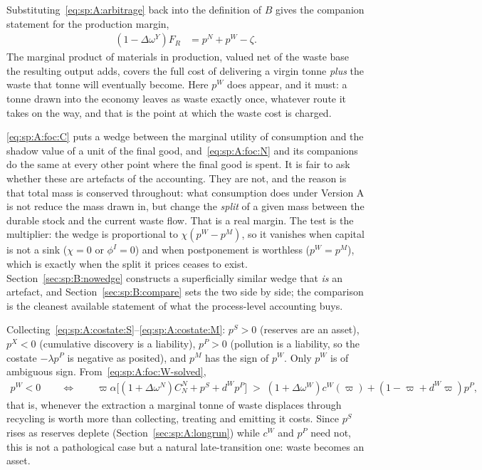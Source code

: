 Substituting~\eqref{eq:sp:A:arbitrage} back into the definition of $B$ gives the companion
statement for the production margin,
\begin{align}
\left(1-\Delta\omega^Y\right)F_R &= p^N+p^W-\zeta .
\label{eq:sp:A:FR}
\end{align}
The marginal product of materials in production, valued net of the waste base the resulting output
adds, covers the full cost of delivering a virgin tonne \emph{plus} the waste that tonne will
eventually become. Here $p^W$ does appear, and it must: a tonne drawn into the economy leaves as waste
exactly once, whatever route it takes on the way, and that is the point at which the waste cost is
charged.

 \eqref{eq:sp:A:foc:C} puts a wedge between the marginal utility of
consumption and the shadow value of a unit of the final good, and~\eqref{eq:sp:A:foc:N} and its
companions do the same at every other point where the final good is spent. It is fair to ask whether
these are artefacts of the accounting. They are not, and the reason is that total mass is conserved
throughout: what consumption does under Version A is not reduce the mass drawn in, but change the
\emph{split} of a given mass between the durable stock and the current waste flow. That is a real
margin. The test is the multiplier: the wedge is proportional to $\chi\left(p^W-p^M\right)$, so it
vanishes when capital is not a sink ($\chi=0$ or $\phi^I=0$) and when postponement is worthless
($p^W=p^M$), which is exactly when the split it prices ceases to exist.
Section~\ref{sec:sp:B:nowedge} constructs a superficially similar wedge that \emph{is} an artefact, and
Section~\ref{sec:sp:B:compare} sets the two side by side; the comparison is the cleanest available
statement of what the process-level accounting buys.

 Collecting~\eqref{eq:sp:A:costate:S}--\eqref{eq:sp:A:costate:M}:
$p^S>0$ (reserves are an asset), $p^X<0$ (cumulative discovery is a liability), $p^P>0$ (pollution is a
liability, so the costate $-\lambda p^P$ is negative as posited), and $p^M$ has the sign of $p^W$.
Only $p^W$ is of ambiguous sign. From~\eqref{eq:sp:A:foc:W-solved},
\begin{align}
p^W<0
\qquad\Longleftrightarrow\qquad
\varpi\alpha\Big[\left(1+\Delta\omega^N\right)C^N_N+p^S+d^Wp^P\Big]
\;>\;
\left(1+\Delta\omega^W\right)c^W\!\left(\varpi\right)+\left(1-\varpi+d^W\varpi\right)p^P,
\label{eq:sp:A:pW-sign}
\end{align}
that is, whenever the extraction a marginal tonne of waste displaces through recycling is worth more
than collecting, treating and emitting it costs. Since $p^S$ rises as reserves deplete
(Section~\ref{sec:sp:A:longrun}) while $c^W$ and $p^P$ need not, this is not a pathological case but a
natural late-transition one: waste becomes an asset.

